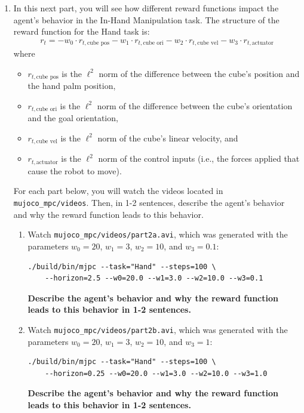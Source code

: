 \documentclass[12pt]{article}
\begin{document}
\begin{enumerate}
\item In this next part, you will see how different reward functions impact the agent's behavior in the In-Hand Manipulation task. The structure of the reward function for the Hand task is:
\begin{align*}
    r_t = -w_0 \cdot r_{t, \text{cube pos}} - w_1 \cdot r_{t, \text{cube ori}} - w_2 \cdot r_{t, \text{cube vel}} - w_3 \cdot r_{t, \text{actuator}}
\end{align*}
where
\begin{itemize}
    \item $r_{t, \text{cube pos}}$ is the $\ell^2$ norm of the difference between the cube's position and the hand palm position,
    \item $r_{t, \text{cube ori}}$ is the $\ell^2$ norm of the difference between the cube's orientation and the goal orientation,
    \item $r_{t, \text{cube vel}}$ is the $\ell^2$ norm of the cube's linear velocity, and
    \item $r_{t, \text{actuator}}$ is the $\ell^2$ norm of the control inputs (i.e., the forces applied that cause the robot to move).
\end{itemize}
For each part below, you will watch the videos located in \texttt{mujoco\_mpc/videos}. Then, in 1-2 sentences, describe the agent's behavior and why the reward function leads to this behavior.

\begin{enumerate}[itemsep=20pt]
    \item Watch \texttt{mujoco\_mpc/videos/part2a.avi}, which was generated with the parameters $w_0 = 20$, $w_1 = 3$, $w_2 = 10$, and $w_3 = 0.1$:
\begin{tcolorbox}[width=\linewidth, sharp corners=all, colback=white!95!black]
\begin{verbatim}
./build/bin/mjpc --task="Hand" --steps=100 \
    --horizon=2.5 --w0=20.0 --w1=3.0 --w2=10.0 --w3=0.1
\end{verbatim}
\end{tcolorbox}

\textbf{\color{red}Describe the agent's behavior and why the reward function leads to this behavior in 1-2 sentences.}

    \item Watch \texttt{mujoco\_mpc/videos/part2b.avi}, which was generated with the parameters $w_0 = 20$, $w_1 = 3$, $w_2 = 10$, and $w_3 = 1$:
\begin{tcolorbox}[width=\linewidth, sharp corners=all, colback=white!95!black]
\begin{verbatim}
./build/bin/mjpc --task="Hand" --steps=100 \
    --horizon=0.25 --w0=20.0 --w1=3.0 --w2=10.0 --w3=1.0
\end{verbatim}
\end{tcolorbox}
\textbf{\color{red}Describe the agent's behavior and why the reward function leads to this behavior in 1-2 sentences.}


\end{enumerate}
\end{enumerate}
\end{document}
